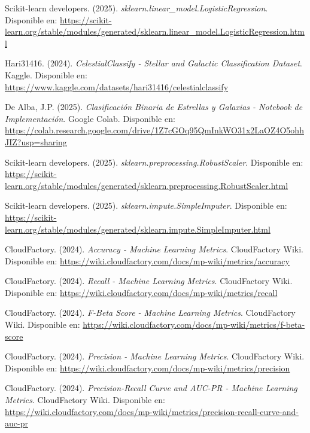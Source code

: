 \documentclass{article}
\begin{document}
\begin{thebibliography}{9}

Scikit-learn developers. (2025). \textit{sklearn.linear\_model.LogisticRegression}. 
Disponible en: \url{https://scikit-learn.org/stable/modules/generated/sklearn.linear_model.LogisticRegression.html}

Hari31416. (2024). \textit{CelestialClassify - Stellar and Galactic Classification Dataset}. Kaggle. 
Disponible en: \url{https://www.kaggle.com/datasets/hari31416/celestialclassify}

De Alba, J.P. (2025). \textit{Clasificación Binaria de Estrellas y Galaxias - Notebook de Implementación}. Google Colab. 
Disponible en: \url{https://colab.research.google.com/drive/1Z7cGOq95QmInkWO31x2LaOZ4O5ohhJIZ?usp=sharing}

Scikit-learn developers. (2025). \textit{sklearn.preprocessing.RobustScaler}. 
Disponible en: \url{https://scikit-learn.org/stable/modules/generated/sklearn.preprocessing.RobustScaler.html}

Scikit-learn developers. (2025). \textit{sklearn.impute.SimpleImputer}. 
Disponible en: \url{https://scikit-learn.org/stable/modules/generated/sklearn.impute.SimpleImputer.html}

CloudFactory. (2024). \textit{Accuracy - Machine Learning Metrics}. CloudFactory Wiki. 
Disponible en: \url{https://wiki.cloudfactory.com/docs/mp-wiki/metrics/accuracy}

CloudFactory. (2024). \textit{Recall - Machine Learning Metrics}. CloudFactory Wiki. 
Disponible en: \url{https://wiki.cloudfactory.com/docs/mp-wiki/metrics/recall}

CloudFactory. (2024). \textit{F-Beta Score - Machine Learning Metrics}. CloudFactory Wiki. 
Disponible en: \url{https://wiki.cloudfactory.com/docs/mp-wiki/metrics/f-beta-score}

CloudFactory. (2024). \textit{Precision - Machine Learning Metrics}. CloudFactory Wiki. 
Disponible en: \url{https://wiki.cloudfactory.com/docs/mp-wiki/metrics/precision}

CloudFactory. (2024). \textit{Precision-Recall Curve and AUC-PR - Machine Learning Metrics}. CloudFactory Wiki. 
Disponible en: \url{https://wiki.cloudfactory.com/docs/mp-wiki/metrics/precision-recall-curve-and-auc-pr}


\end{thebibliography}
\end{document}
